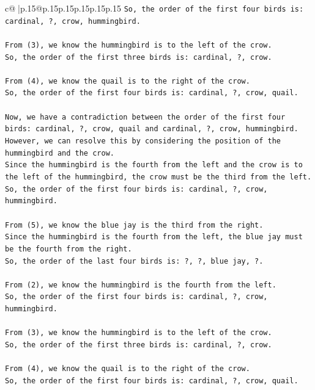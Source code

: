 \documentclass{article}
\begin{document}
{\begin{supertabular}{c@{$\;$}|p{.15\linewidth}@{}p{.15\linewidth}p{.15\linewidth}p{.15\linewidth}p{.15\linewidth}p{.15\linewidth}}
{{{\texttt{So, the order of the first four birds is: cardinal, ?, crow, hummingbird.} \\
\\ 
\texttt{From (3), we know the hummingbird is to the left of the crow. } \\
\texttt{So, the order of the first three birds is: cardinal, ?, crow.} \\
\\ 
\texttt{From (4), we know the quail is to the right of the crow. } \\
\texttt{So, the order of the first four birds is: cardinal, ?, crow, quail.} \\
\\ 
\texttt{Now, we have a contradiction between the order of the first four birds: cardinal, ?, crow, quail and cardinal, ?, crow, hummingbird. } \\
\texttt{However, we can resolve this by considering the position of the hummingbird and the crow. } \\
\texttt{Since the hummingbird is the fourth from the left and the crow is to the left of the hummingbird, the crow must be the third from the left. } \\
\texttt{So, the order of the first four birds is: cardinal, ?, crow, hummingbird.} \\
\\ 
\texttt{From (5), we know the blue jay is the third from the right. } \\
\texttt{Since the hummingbird is the fourth from the left, the blue jay must be the fourth from the right. } \\
\texttt{So, the order of the last four birds is: ?, ?, blue jay, ?.} \\
\\ 
\texttt{From (2), we know the hummingbird is the fourth from the left. } \\
\texttt{So, the order of the first four birds is: cardinal, ?, crow, hummingbird.} \\
\\ 
\texttt{From (3), we know the hummingbird is to the left of the crow. } \\
\texttt{So, the order of the first three birds is: cardinal, ?, crow.} \\
\\ 
\texttt{From (4), we know the quail is to the right of the crow. } \\
\texttt{So, the order of the first four birds is: cardinal, ?, crow, quail.} \\
}}}
\end{supertabular}}
\end{document}
